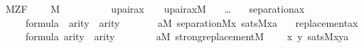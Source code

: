\begin{isabelle}
\isamarkupfalse%
\ M{\isacharunderscore}ZF\ {\isacharequal}\ \isanewline
\ \ M\ \isanewline
\ \ \isanewline
\ \ \ \ \ \ upair{\isacharunderscore}ax{\isacharcolon}\ \ \ \ {\isachardoublequoteopen}upair{\isacharunderscore}ax{\isacharparenleft}{\isacharhash}{\isacharhash}M{\isacharparenright}{\isachardoublequoteclose}\isanewline
\ \ \ \dots \isanewline
\ \ \ separation{\isacharunderscore}ax{\isacharcolon}\isanewline
\ \ {\isachardoublequoteopen}{\isasymlbrakk}\ {\isasymphi}\ {\isasymin}\ formula\ {\isacharsemicolon}\ arity{\isacharparenleft}{\isasymphi}{\isacharparenright}{\isacharequal}{}\ {\isasymor}\ arity{\isacharparenleft}{\isasymphi}{\isacharparenright}{\isacharequal}{}\ {\isasymrbrakk}\isanewline\ \ \ \ {\isasymLongrightarrow}\isanewline
\ \ {\isacharparenleft}{\isasymforall}a{\isasymin}M{\isachardot}\ separation{\isacharparenleft}{\isacharhash}{\isacharhash}M{\isacharcomma}{\isasymlambda}x{\isachardot}\ sats{\isacharparenleft}M{\isacharcomma}{\isasymphi}{\isacharcomma}{\isacharbrackleft}x{\isacharcomma}a{\isacharbrackright}{\isacharparenright}{\isacharparenright}{\isacharparenright}{\isachardoublequoteclose}\isanewline
\ \ \ replacement{\isacharunderscore}ax{\isacharcolon}\isanewline 
\ \ {\isachardoublequoteopen}{\isasymlbrakk}\ {\isasymphi}\ {\isasymin}\ formula{\isacharsemicolon}\ arity{\isacharparenleft}{\isasymphi}{\isacharparenright}{\isacharequal}{}\ {\isasymor}\ arity{\isacharparenleft}{\isasymphi}{\isacharparenright}{\isacharequal}{}\ {\isasymrbrakk}\isanewline
\ \ \ \ {\isasymLongrightarrow}\isanewline
\ \ {\isacharparenleft}{\isasymforall}a{\isasymin}M{\isachardot}\ strong{\isacharunderscore}replacement{\isacharparenleft}{\isacharhash}{\isacharhash}M{\isacharcomma}\isanewline
\ \ \ \ {\isasymlambda}x\ y{\isachardot}\ sats{\isacharparenleft}M{\isacharcomma}{\isasymphi}{\isacharcomma}{\isacharbrackleft}x{\isacharcomma}y{\isacharcomma}a{\isacharbrackright}{\isacharparenright}{\isacharparenright}{\isacharparenright}{\isachardoublequoteclose}
\end{isabelle}
